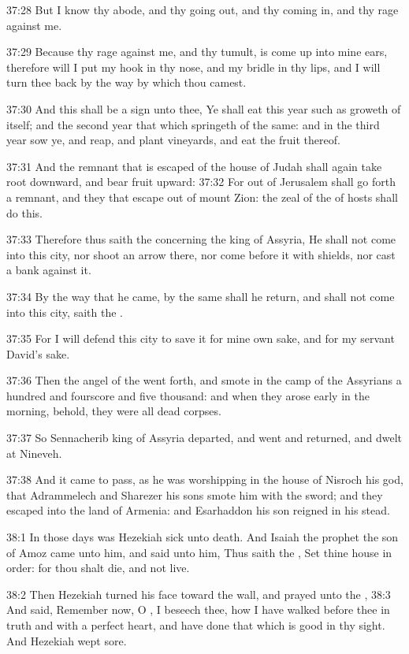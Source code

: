 37:28 But I know thy abode, and thy going out, and thy coming in, and
thy rage against me.

37:29 Because thy rage against me, and thy tumult, is come up into
mine ears, therefore will I put my hook in thy nose, and my bridle in
thy lips, and I will turn thee back by the way by which thou camest.

37:30 And this shall be a sign unto thee, Ye shall eat this year such
as groweth of itself; and the second year that which springeth of the
same: and in the third year sow ye, and reap, and plant vineyards, and
eat the fruit thereof.

37:31 And the remnant that is escaped of the house of Judah shall
again take root downward, and bear fruit upward: 37:32 For out of
Jerusalem shall go forth a remnant, and they that escape out of mount
Zion: the zeal of the \LORD of hosts shall do this.

37:33 Therefore thus saith the \LORD concerning the king of Assyria, He
shall not come into this city, nor shoot an arrow there, nor come
before it with shields, nor cast a bank against it.

37:34 By the way that he came, by the same shall he return, and shall
not come into this city, saith the \LORD.

37:35 For I will defend this city to save it for mine own sake, and
for my servant David's sake.

37:36 Then the angel of the \LORD went forth, and smote in the camp of
the Assyrians a hundred and fourscore and five thousand: and when they
arose early in the morning, behold, they were all dead corpses.

37:37 So Sennacherib king of Assyria departed, and went and returned,
and dwelt at Nineveh.

37:38 And it came to pass, as he was worshipping in the house of
Nisroch his god, that Adrammelech and Sharezer his sons smote him with
the sword; and they escaped into the land of Armenia: and Esarhaddon
his son reigned in his stead.

38:1 In those days was Hezekiah sick unto death. And Isaiah the
prophet the son of Amoz came unto him, and said unto him, Thus saith
the \LORD, Set thine house in order: for thou shalt die, and not live.

38:2 Then Hezekiah turned his face toward the wall, and prayed unto
the \LORD, 38:3 And said, Remember now, O \LORD, I beseech thee, how I
have walked before thee in truth and with a perfect heart, and have
done that which is good in thy sight. And Hezekiah wept sore.

